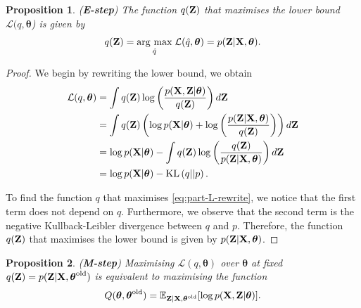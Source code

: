 \documentclass[12pt, oneside]{book}
\numberwithin{equation}{section}
\newcommand{\argmax}[1]{\underset{#1}{\operatorname{arg}\,\operatorname{max}}\;}
\newcommand{\KL}[2]{\text{KL}\left(#1 \vert\vert #2\right)}
\newcommand{\X}{{\bf X}}
\newcommand{\Z}{{\bf Z}}
\newtheorem{proposition}{Proposition}[section]
\begin{document}
{%
\begin{proposition} (\textbf{E-step})
	The function $q({\bf Z})$ that maximises the lower bound $\mathcal L(q, \boldsymbol{\theta}$) is given by
	\begin{equation}
		q(\Z) = \argmax{\hat q} \mathcal{L}(\hat q, \boldsymbol\theta) = p({\bf Z} \vert {\bf X}, \boldsymbol\theta).
	\end{equation}
\end{proposition}

\begin{proof}
	We begin by rewriting the lower bound, we obtain
	\begin{align}
		\mathcal{L}(q, \boldsymbol\theta) &= \int q(\Z)\log\left(\frac{p(\X, \Z \vert \boldsymbol\theta)}{q(\Z)}\right) d{\bf Z}\\
		&= \int q(\Z) \left(\log p(\X\vert\boldsymbol\theta) + \log\left( \frac{p(\Z \vert \X, \boldsymbol\theta)}{q(\Z)} \right) \right) d\Z\\
		&= \log p(\X \vert \boldsymbol{\theta}) - \int q(\Z) \log\left(\frac{q(\Z)}{p(\Z \vert \X, \boldsymbol\theta)}\right) d\Z\\
		&= \log p(\X \vert \boldsymbol\theta) - \KL{q}{p}. \label{eq:part-L-rewrite}
	\end{align}
	
	To find the function $q$ that maximises \eqref{eq:part-L-rewrite}, we notice that the first term does not depend on $q$. Furthermore, we observe that the second term is the negative Kullback-Leibler divergence between $q$ and $p$. Therefore, the function $q(\Z)$ that maximises the lower bound is given by $p(\Z \vert \X, \boldsymbol\theta)$.
\end{proof}

\begin{proposition}\label{prop:m-step}
	(\textbf{M-step}) Maximising $\mathcal{L}(q, \boldsymbol{\theta})$ over $\boldsymbol{\theta}$ at fixed $q({\bf Z}) = p({\bf Z} \vert {\bf X}, \boldsymbol\theta^\text{old})$ is equivalent to maximising the function
	\begin{equation}
		Q(\boldsymbol{\theta}, \boldsymbol{\theta}^\text{old}) = \mathbb{E}_{{\bf Z}\vert {\bf X}, \boldsymbol{\theta}^\text{old}}[\log p({\bf X}, {\bf Z}\vert \boldsymbol\theta)].
	\end{equation}
\end{proposition}

}
\end{document}

